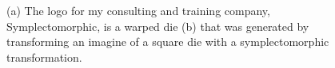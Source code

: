 \documentclass[
  letterpaper,
  DIV=11,
  numbers=noendperiod]{scrartcl}
\begin{document}
\begin{figure}

\begin{minipage}{0.34\linewidth}


\subcaption{\label{fig-logo}}

\end{minipage}%
%
\begin{minipage}{0.66\linewidth}


\subcaption{\label{fig-flow}}

\end{minipage}%

\caption{\label{fig-logo-motivation}(a) The logo for my consulting and
training company, Symplectomorphic, is a warped die (b) that was
generated by transforming an imagine of a square die with a
symplectomorphic transformation.}

\end{figure}%
\end{document}

